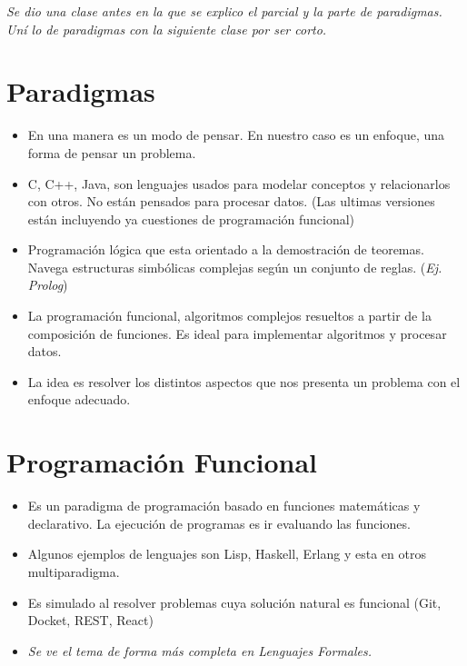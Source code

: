 

\textit{Se dio una clase antes en la que se explico el parcial y la parte de paradigmas. Uní lo de paradigmas con la siguiente clase por ser corto.}

\section{Paradigmas}
\begin{itemize}
\item En una manera es un modo de pensar. En nuestro caso es un enfoque, una forma de pensar un problema.
\item C, C++, Java, son lenguajes usados para modelar conceptos y relacionarlos con otros. No están pensados para procesar datos. (Las ultimas versiones están incluyendo ya cuestiones de programación funcional)
\item Programación lógica que esta orientado a la demostración de teoremas. Navega estructuras simbólicas complejas según un conjunto de reglas. (\textit{Ej. Prolog})
\item La programación funcional, algoritmos complejos resueltos a partir de la composición de funciones. Es ideal para implementar algoritmos y procesar datos.
\item La idea es resolver los distintos aspectos que nos presenta un problema con el enfoque adecuado.
\end{itemize}




\section{Programación Funcional}

\begin{itemize}
\item Es un paradigma de programación basado en funciones matemáticas y declarativo. La ejecución de programas es ir evaluando las funciones.
\item Algunos ejemplos de lenguajes son Lisp, Haskell, Erlang y esta en otros multiparadigma.
\item Es simulado al resolver problemas cuya solución natural es funcional (Git, Docket, REST, React)
\item \textit{Se ve el tema de forma más completa en Lenguajes Formales.}
\end{itemize}

